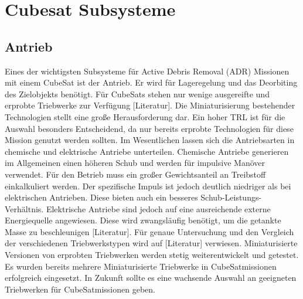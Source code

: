 	\section{Cubesat Subsysteme}%
		\subsection{Antrieb}%
Eines der wichtigsten Subsysteme für Active Debris Removal (ADR) Missionen mit einem CubeSat ist der Antrieb. Er wird für Lageregelung und das Deorbiting des Zielobjekts benötigt.
Für CubeSats stehen nur wenige ausgereifte und erprobte Triebwerke zur Verfügung [Literatur].  Die Miniaturisierung bestehender Technologien stellt eine große Herausforderung dar. Ein hoher TRL ist für die Auswahl besonders Entscheidend, da nur bereits erprobte Technologien für diese Mission genutzt werden sollten.
Im Wesentlichen lassen sich die Antriebsarten in chemische und elektrische Antriebe unterteilen.  Chemische Antriebe generieren im Allgemeinen einen höheren Schub und werden für impulsive Manöver verwendet. Für den Betrieb muss ein großer Gewichtsanteil an Treibstoff einkalkuliert werden. Der spezifische Impuls ist jedoch deutlich niedriger als bei elektrischen Antrieben. Diese bieten auch ein besseres Schub-Leistungs-Verhältnis. Elektrische Antriebe sind jedoch auf eine ausreichende externe Energiequelle angewiesen. Diese wird zwangsläufig benötigt, um die getankte Masse zu beschleunigen [Literatur].
Für genaue Untersuchung und den Vergleich der verschiedenen Triebwerkstypen wird auf [Literatur] verwiesen. Miniaturisierte Versionen von erprobten Triebwerken werden stetig weiterentwickelt und getestet. Es wurden bereits mehrere Miniaturisierte Triebwerke in CubeSatmissionen erfolgreich eingesetzt. In Zukunft sollte es eine wachsende Auswahl an geeigneten Triebwerken für CubeSatmissionen geben. 
